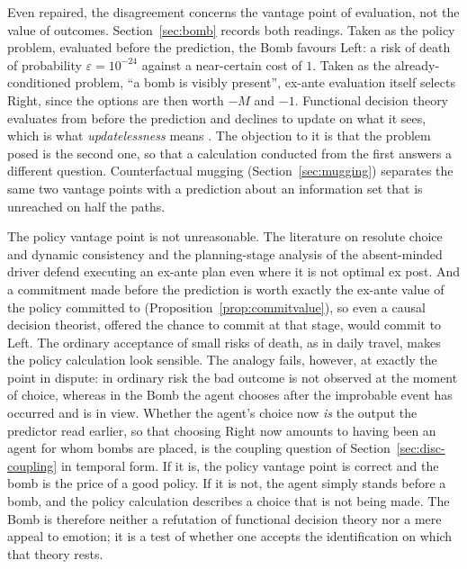 Even repaired, the disagreement concerns the vantage point of evaluation, not the value of outcomes.
Section~\ref{sec:bomb} records both readings. Taken as the policy problem, evaluated before the
prediction, the Bomb favours Left: a risk of death of probability $\varepsilon=10^{-24}$ against a
near-certain cost of $1$. Taken as the already-conditioned problem, \enquote{a bomb is visibly
present}, ex-ante evaluation itself selects Right, since the options are then worth $-M$ and $-1$.
Functional decision theory evaluates from before the prediction and declines to update on what it
sees, which is what \emph{updatelessness} means \autocite{dai2009,yudkowskysoares2017}. The objection
to it is that the problem posed is the second one, so that a calculation conducted from the first
answers a different question. Counterfactual mugging (Section~\ref{sec:mugging}) separates the same
two vantage points with a prediction about an information set that is unreached on half the paths.

The policy vantage point is not unreasonable. The literature on resolute choice and dynamic
consistency \autocite{mcclennen1990,gauthier1994} and the planning-stage analysis of the absent-minded
driver \autocite{piccionerubinstein1997,aumannetal1997} defend executing an ex-ante plan even where it is
not optimal ex post. And a commitment made before the prediction is worth exactly the ex-ante value of
the policy committed to (Proposition~\ref{prop:commitvalue}), so even a causal decision theorist,
offered the chance to commit at that stage, would commit to Left. The ordinary acceptance of small
risks of death, as in daily travel, makes the policy calculation look sensible. The analogy fails,
however, at exactly the point in dispute: in ordinary risk the bad outcome is not observed at the
moment of choice, whereas in the Bomb the agent chooses after the improbable event has occurred and
is in view. Whether the agent's choice now \emph{is} the output the predictor read earlier, so that
choosing Right now amounts to having been an agent for whom bombs are placed, is the coupling question
of Section~\ref{sec:disc-coupling} in temporal form. If it is, the policy vantage point is correct and
the bomb is the price of a good policy. If it is not, the agent simply stands before a bomb, and the
policy calculation describes a choice that is not being made. The Bomb is therefore neither a
refutation of functional decision theory nor a mere appeal to emotion; it is a test of whether one
accepts the identification on which that theory rests.

